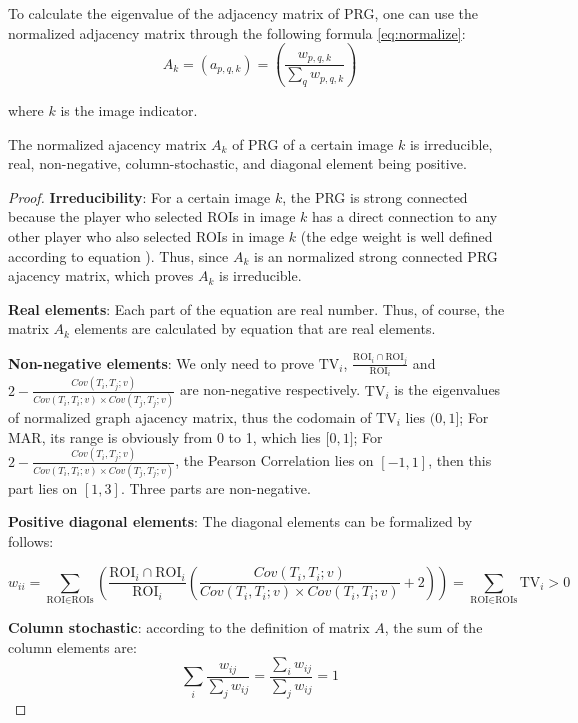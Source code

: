 
To calculate the eigenvalue of the adjacency matrix of PRG, one can use the normalized adjacency matrix 
through the following formula \ref{eq:normalize}:
\begin{equation}
\label{eq:normalize}
A_k = (a_{p,q,k}) = (\frac{w_{p,q,k}}{\sum_{q}{w_{p,q,k}}})
\end{equation}

where $k$ is the image indicator.

\begin{theorem}
The normalized ajacency matrix $A_k$ of PRG of a certain image $k$ is irreducible, real, 
non-negative, column-stochastic, and diagonal element being positive.
\end{theorem}

\begin{proof}
\textbf{Irreducibility}: For a certain image $k$, the PRG is strong connected because the
player who selected ROIs in image $k$ has a direct connection to any other player who also selected ROIs in image $k$ 
(the edge weight is well defined according to equation \label{eq:weight}).
Thus, since $A_k$ is an normalized strong connected PRG ajacency matrix, which proves $A_k$ is irreducible.

\textbf{Real elements}: Each part of the equation \label{eq:weight} are real number. Thus, of course,
the matrix $A_k$ elements are calculated by equation \label{eq:normalize} that are real elements.

\textbf{Non-negative elements}: We only need to prove $\text{TV}_i$, 
$\frac{\text{ROI}_i\cap\text{ROI}_j}{\text{ROI}_i}$ and 
$2-\frac{Cov(T_i, T_j; v)}{Cov(T_i, T_i; v)\times Cov(T_j, T_j; v)}$ are non-negative 
respectively. $\text{TV}_i$ is the eigenvalues of normalized graph ajacency matrix, 
thus the codomain of $\text{TV}_i$ lies $(0, 1\rbrack$; For MAR, its range is obviously from 0 to 1,
which lies $\lbrack 0, 1 \rbrack$; For $2-\frac{Cov(T_i, T_j; v)}{Cov(T_i, T_i; v)\times Cov(T_j, T_j; v)}$,
the Pearson Correlation lies on $[-1, 1]$, then this part lies on $[1, 3]$.
Three parts are non-negative.
  
\textbf{Positive diagonal elements}: The diagonal elements can be formalized by follows:

\[
w_{ii} = 
\sum_{\text{ROI}\in\text{ROIs}}{\left(
  \frac{\text{ROI}_i\cap\text{ROI}_i}{\text{ROI}_i}
  \left( \frac{Cov(T_i, T_i; v)}
      {Cov(T_i, T_i; v)\times Cov(T_i, T_i; v)} + 2 \right)\right)
} = \sum_{\text{ROI}\in\text{ROIs}}{\text{TV}_i} > 0
\]

\textbf{Column stochastic}: according to the definition of matrix $A$, the sum of the column
elements are:
\[
  \sum_{i}{\frac{w_{ij}}{\sum_{j}{w_{ij}}}} 
  = \frac{\sum_{i}{w_{ij}}}{\sum_{j}{w_{ij}}} = 1
\]
\end{proof}

